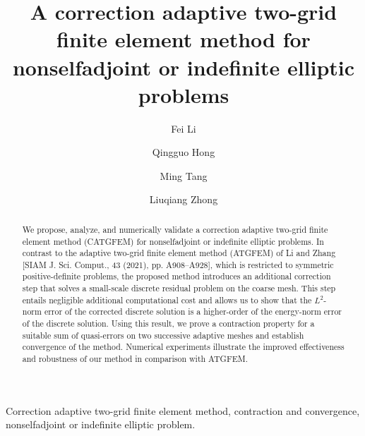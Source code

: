 \documentclass[preprint,times]{elsarticle}%
\numberwithin{algorithm}{section}
\numberwithin{equation}{section}
\begin{document}
\begin{frontmatter}
	
\title{A correction adaptive two-grid finite element method for nonselfadjoint or indefinite elliptic problems}

	
\author[LNSF]{Fei Li}

\author[MST]{Qingguo Hong}

\author[GZU]{Ming Tang}

\author[SCNU]{Liuqiang Zhong}



\address[LNSF]{School of Mathematics and Statistics, Lingnan Normal University, Zhanjiang, Guangdong, 524048, China}
\address[MST]{Department of Mathematics and Statistics, Missouri University of Science and Technology, Rolla, MO 65409, USA}
\address[GZU]{School of Mathematics and Information Science, Guangzhou University, Guangzhou, Guangdong, 510405, China}
\address[SCNU]{School of Mathematical Sciences, South China Normal University, Guangzhou, Guangdong, 510631, China}



\begin{abstract}
We propose, analyze, and numerically validate a correction adaptive two-grid finite element method (CATGFEM) for nonselfadjoint or indefinite elliptic problems. In contrast to the adaptive two-grid finite element method (ATGFEM) of Li and Zhang [SIAM J. Sci. Comput., 43 (2021), pp. A908–A928], which is restricted to symmetric positive-definite problems, the proposed method introduces an additional correction step that solves a small-scale discrete residual problem on the coarse mesh. This step entails negligible additional computational cost and allows us to show that the $L^2$-norm error of the corrected discrete solution is a higher-order of the energy-norm error of the discrete solution. Using this result, we prove a contraction property for a suitable sum of quasi-errors on two successive adaptive meshes and establish convergence of the method. Numerical experiments illustrate the improved effectiveness and robustness of our method in comparison with ATGFEM.
 \end{abstract}

\begin{keyword}
	Correction adaptive two-grid finite element method, contraction and convergence, nonselfadjoint or indefinite elliptic problem.
\end{keyword}

\end{frontmatter}
\end{document}
